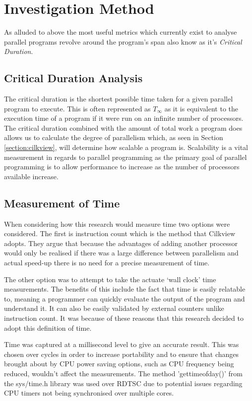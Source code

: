 \section{Investigation Method}

As alluded to above the most useful metrics which currently exist to analyse parallel programs revolve around the program's span also know as it's \emph{Critical Duration}.

\subsection{Critical Duration Analysis}

The critical duration is the shortest possible time taken for a given parallel program to execute. This is often represented as \(T_\infty\) as it is equivalent to the execution time of a program if it were run on an infinite number of processors. The critical duration combined with the amount of total work a program does allows us to calculate the degree of parallelism which, as seen in Section \ref{section:cilkview}, will determine how scalable a program is. Scalability is a vital measurement in regards to parallel programming as the primary goal of parallel programming is to allow performance to increase as the number of processors available increase. 

\subsection{Measurement of Time}

When considering how this research would measure time two options were considered. The first is instruction count which is the method that Cilkview \cite{id8} adopts. They argue that because the advantages of adding another processor would only be realised if there was a large difference between parallelism and actual speed-up there is no need for a precise measurement of time. 

The other option was to attempt to take the actuate `wall clock' time measurements. The benefits of this include the fact that time is easily relatable to, meaning a programmer can quickly evaluate the output of the program and understand it. It can also be easily validated by external counters unlike instruction count. It was because of these reasons that this research decided to adopt this definition of time. 

Time was captured at a millisecond level to give an accurate result. This was chosen over cycles in order to increase portability and to ensure that changes brought about by CPU power saving options, such as CPU frequency being reduced, wouldn't affect the measurements. The method 'gettimeofday()' from the sys/time.h library was used over RDTSC \cite{id22} due to potential issues regarding CPU timers not being synchronised over multiple cores. 

